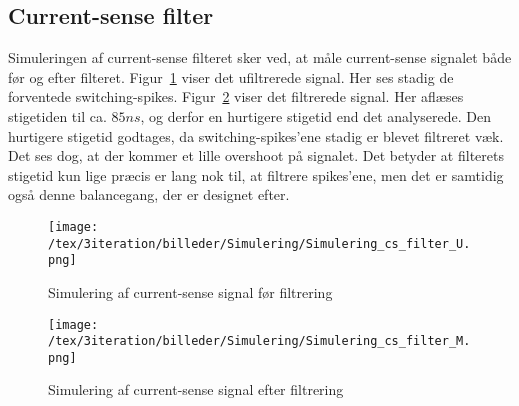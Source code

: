 
\subsection{Current-sense filter}
Simuleringen af current-sense filteret sker ved, at måle current-sense signalet både før og efter filteret. Figur~\ref{fig:Simulering_PWM_current_sense_U_3} viser det ufiltrerede signal. Her ses stadig de forventede switching-spikes. Figur~\ref{fig:Simulering_PWM_current_sense_M_3} viser det filtrerede signal. Her aflæses stigetiden til ca. $85ns$, og derfor en hurtigere stigetid end det analyserede. Den hurtigere stigetid godtages, da switching-spikes'ene stadig er blevet filtreret væk. Det ses dog, at der kommer et lille overshoot på signalet. Det betyder at filterets stigetid kun lige præcis er lang nok til, at filtrere spikes'ene, men det er samtidig også denne balancegang, der er designet efter. 

\begin{figure}[H]
	\center
	\texttt{[image: /tex/3iteration/billeder/Simulering/Simulering\_cs\_filter\_U.png]}
	\caption{Simulering af current-sense signal før filtrering}
	\label{fig:Simulering_PWM_current_sense_U_3}
\end{figure}

\begin{figure}[H]
	\center
	\texttt{[image: /tex/3iteration/billeder/Simulering/Simulering\_cs\_filter\_M.png]}
	\caption{Simulering af current-sense signal efter filtrering}
	\label{fig:Simulering_PWM_current_sense_M_3}
\end{figure}